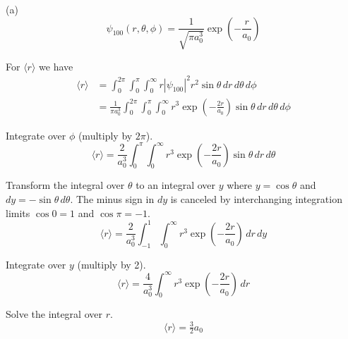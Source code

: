 


\bigskip
(a)
\begin{equation*}
\psi_{100}(r,\theta,\phi)=\frac{1}{\sqrt{\pi a_0^3}}\exp\left(-\frac{r}{a_0}\right)
\end{equation*}

For $\langle r\rangle$ we have
\begin{align*}
\langle r\rangle&=\int_0^{2\pi}\int_0^\pi\int_0^\infty r|\psi_{100}|^2r^2\sin\theta\,dr\,d\theta\,d\phi
\\
&=\frac{1}{\pi a_0^3}\int_0^{2\pi}\int_0^\pi\int_0^\infty
r^3\exp\left(-\frac{2r}{a_0}\right)\sin\theta\,dr\,d\theta\,d\phi
\end{align*}

Integrate over $\phi$ (multiply by $2\pi$).
\begin{equation*}
\langle r\rangle=\frac{2}{a_0^3}\int_0^\pi\int_0^\infty
r^3\exp\left(-\frac{2r}{a_0}\right)\sin\theta\,dr\,d\theta
\end{equation*}

Transform the integral over $\theta$ to an integral over $y$ where
$y=\cos\theta$ and $dy=-\sin\theta\,d\theta$.
The minus sign in $dy$ is canceled by interchanging integration limits
$\cos0=1$ and $\cos\pi=-1$.
\begin{equation*}
\langle r\rangle=\frac{2}{a_0^3}\int_{-1}^1\int_0^\infty
r^3\exp\left(-\frac{2r}{a_0}\right)\,dr\,dy
\end{equation*}

Integrate over $y$ (multiply by 2).
\begin{equation*}
\langle r\rangle=\frac{4}{a_0^3}\int_0^\infty
r^3\exp\left(-\frac{2r}{a_0}\right)\,dr
\end{equation*}

Solve the integral over $r$.
\begin{equation*}
\langle r\rangle=\tfrac{3}{2}a_0\tag{1}
\end{equation*}

